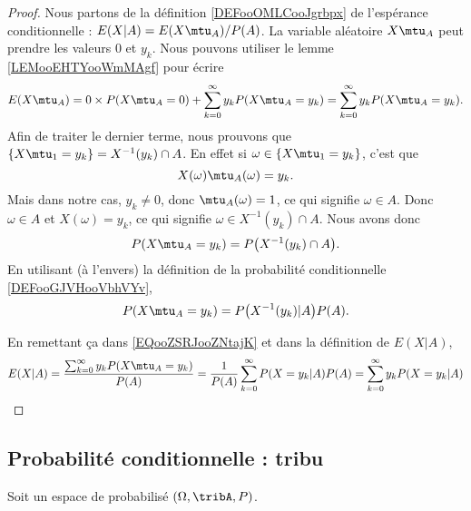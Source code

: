 \begin{proof}
    Nous partons de la définition \ref{DEFooOMLCooJgrbpx} de l'espérance conditionnelle : \( E(X|A)=E(X\mtu_A)/P(A)\). La variable aléatoire \( X\mtu_A\) peut prendre les valeurs \( 0\) et  \( y_k\). Nous pouvons utiliser le lemme \ref{LEMooEHTYooWmMAgf} pour écrire
    \begin{equation}        \label{EQooZSRJooZNtajK}
        E(X\mtu_A)=0\times P(X\mtu_A=0)+\sum_{k=0}^{\infty}y_kP(X\mtu_A=y_k)=\sum_{k=0}^{\infty}y_kP(X\mtu_A=y_k).
    \end{equation}
    Afin de traiter le dernier terme, nous prouvons que \( \{ X\mtu_1=y_k \}=X^{-1}(y_k)\cap A\). En effet si \( \omega\in\{ X\mtu_1=y_k \}\), c'est que
    \begin{equation}
        X(\omega)\mtu_A(\omega)=y_k.
    \end{equation}
    Mais dans notre cas, \( y_k\neq 0\), donc \( \mtu_A(\omega)=1\), ce qui signifie \( \omega\in A\). Donc \( \omega\in A\) et \( X(\omega)=y_k\), ce qui signifie \( \omega\in X^{-1}(y_k)\cap A\). Nous avons donc
    \begin{equation}
        P(X\mtu_A=y_k)=P\big( X^{-1}(y_k)\cap A \big).
    \end{equation}
    En utilisant (à l'envers) la définition de la probabilité conditionnelle \ref{DEFooGJVHooVbhVYv},
    \begin{equation}
        P(X\mtu_A=y_k)=P\big( X^{-1}(y_k)|A \big)P(A).
    \end{equation}
   
    En remettant ça dans \eqref{EQooZSRJooZNtajK} et dans la définition de \( E(X|A)\),
    \begin{equation}
        E(X|A)=\frac{\sum_{k=0}^{\infty}y_kP(X\mtu_A=y_k)}{P(A)}=\frac{1}{ P(A) }\sum_{k=0}^{\infty}P(X=y_k|A)P(A)=\sum_{k=0}^{\infty}y_kP(X=y_k|A)
    \end{equation}
\end{proof}

\subsection{Probabilité conditionnelle : tribu}

Soit un espace de probabilisé \( (\Omega,\tribA,P)\).

